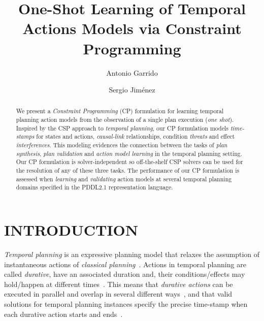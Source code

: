 \documentclass{ecai}
\begin{document}
\title{One-Shot Learning of Temporal Actions Models via Constraint Programming}
\author{Antonio Garrido \and Sergio Jim\'enez}
 
 
\maketitle

\begin{abstract}
  We present a {\em Constraint Programming} (CP) formulation for learning temporal planning  action models from the observation of a single plan execution ({\em one shot}). Inspired by the CSP approach to {\em temporal planning}, our CP formulation models {\em time-stamps} for states and actions, {\em causal-link} relationships, condition {\em threats} and effect {\em interferences}. This modeling evidences the connection between the tasks of {\em plan synthesis}, {\em plan validation} and {\em action model learning} in the temporal planning setting. Our CP formulation is solver-independent so off-the-shelf CSP solvers can be used for the resolution of any of these three tasks. The performance of our CP formulation is assessed when {\em learning} and {\em validating} action models at several temporal planning domains specified in the PDDL2.1 representation language. 
\end{abstract}



\section{INTRODUCTION}

{\em Temporal planning} is an expressive planning model that relaxes the assumption of instantaneous actions of {\em classical planning}~\cite{geffner2013concise}. Actions in temporal planning are called {\em durative}, have an associated duration and, their conditions/effects may hold/happen at different times~\cite{fox2003pddl2}. This means that {\em durative actions} can be executed in parallel and overlap in several different ways~\cite{cushing2007temporal}, and that valid solutions for temporal planning instances specify the precise time-stamp when each durative action starts and ends~\cite{howey2004val}.
\end{document}
